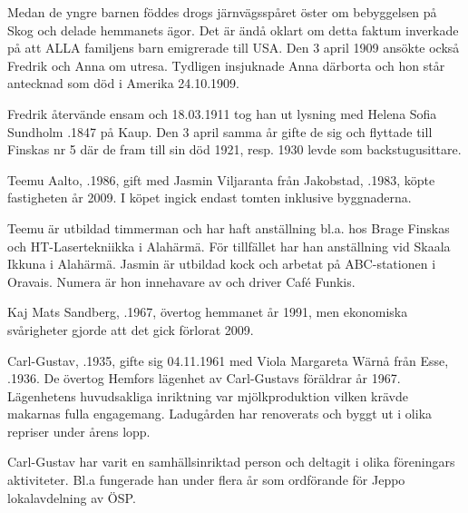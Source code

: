 Medan de yngre barnen föddes drogs järnvägsspåret öster om bebyggelsen på Skog och delade hemmanets ägor. Det är ändå oklart om detta faktum inverkade på att ALLA familjens barn emigrerade till USA. Den 3 april 1909 ansökte också Fredrik och Anna om utresa. Tydligen insjuknade Anna därborta och hon står antecknad som död i Amerika 24.10.1909.

Fredrik återvände ensam och 18.03.1911 tog han ut lysning med Helena Sofia Sundholm .1847 på Kaup. Den 3 april samma år gifte de sig och flyttade till Finskas nr 5 där de fram till sin död 1921, resp. 1930 levde som backstugusittare.



Teemu Aalto, .1986, gift med Jasmin Viljaranta från Jakobstad, .1983, köpte fastigheten år 2009. I köpet ingick endast tomten inklusive byggnaderna.

Teemu är utbildad timmerman och har haft anställning bl.a. hos Brage Finskas och HT-Lasertekniikka i Alahärmä. För tillfället har han anställning vid Skaala Ikkuna i Alahärmä. Jasmin är utbildad kock och arbetat på ABC-stationen i Oravais. Numera är hon innehavare av och driver Café Funkis.
\begin{jhchildren}
  \item {}
  \item {}
  \item {}
\end{jhchildren}



Kaj Mats Sandberg,  .1967, övertog hemmanet år 1991, men ekonomiska svårigheter gjorde att det gick förlorat 2009.



Carl-Gustav, .1935, gifte sig 04.11.1961 med Viola Margareta Wärnå från Esse, .1936. De övertog Hemfors lägenhet av Carl-Gustavs föräldrar år 1967. Lägenhetens huvudsakliga inriktning var mjölkproduktion vilken krävde makarnas fulla engagemang. Ladugården har renoverats och byggt ut i olika repriser under årens lopp.

Carl-Gustav har varit en samhällsinriktad person och deltagit i olika föreningars aktiviteter. Bl.a fungerade han under flera år som
ordförande för Jeppo lokalavdelning av ÖSP.
\begin{jhchildren}
  \item {}
  \item {}
  \item {}
  \item {}
\end{jhchildren}


